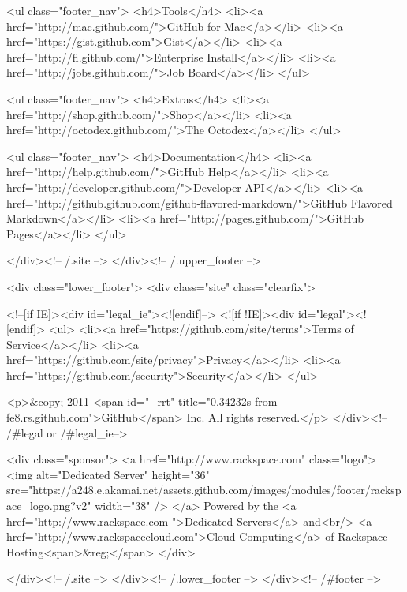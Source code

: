         <ul class="footer_nav">
          <h4>Tools</h4>
          <li><a href="http://mac.github.com/">GitHub for Mac</a></li>
          <li><a href="https://gist.github.com">Gist</a></li>
          <li><a href="http://fi.github.com/">Enterprise Install</a></li>
          <li><a href="http://jobs.github.com/">Job Board</a></li>
        </ul>

        <ul class="footer_nav">
          <h4>Extras</h4>
          <li><a href="http://shop.github.com/">Shop</a></li>
          <li><a href="http://octodex.github.com/">The Octodex</a></li>
        </ul>

        <ul class="footer_nav">
          <h4>Documentation</h4>
          <li><a href="http://help.github.com/">GitHub Help</a></li>
          <li><a href="http://developer.github.com/">Developer API</a></li>
          <li><a href="http://github.github.com/github-flavored-markdown/">GitHub Flavored Markdown</a></li>
          <li><a href="http://pages.github.com/">GitHub Pages</a></li>
        </ul>

        </div><!-- /.site -->
      </div><!-- /.upper_footer -->

      <div class="lower_footer">
        <div class="site" class="clearfix">

        <!--[if IE]><div id="legal_ie"><![endif]-->
        <![if !IE]><div id="legal"><![endif]>
              <ul>
                <li><a href="https://github.com/site/terms">Terms of Service</a></li>
                <li><a href="https://github.com/site/privacy">Privacy</a></li>
                <li><a href="https://github.com/security">Security</a></li>
              </ul>

              <p>&copy; 2011 <span id="_rrt" title="0.34232s from fe8.rs.github.com">GitHub</span> Inc. All rights reserved.</p>
            </div><!-- /#legal or /#legal_ie-->

          
          <div class="sponsor">
              <a href="http://www.rackspace.com" class="logo">
                <img alt="Dedicated Server" height="36" src="https://a248.e.akamai.net/assets.github.com/images/modules/footer/rackspace_logo.png?v2" width="38" />
              </a>
              Powered by the <a href="http://www.rackspace.com ">Dedicated
              Servers</a> and<br/> <a href="http://www.rackspacecloud.com">Cloud
              Computing</a> of Rackspace Hosting<span>&reg;</span>
          </div>
          
        </div><!-- /.site -->
      </div><!-- /.lower_footer -->
    </div><!-- /#footer -->


